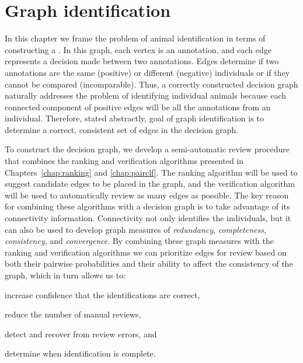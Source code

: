 \chapter{Graph identification}\label{chap:graphid}
\newcommand{\nT}{N}

In this chapter we frame the problem of animal identification in terms of constructing a %
.
In this graph, each vertex is an annotation, and each edge represents a decision made between two annotations.
Edges determine if two annotations are the same (positive) or different (negative) individuals or if they cannot
  be compared (incomparable).
Thus, a correctly constructed decision graph naturally addresses the problem of identifying individual animals
  because each connected component of positive edges will be all the annotations from an individual.
Therefore, stated abstractly, goal of graph identification is to determine a correct, consistent set of edges in
  the decision graph.

To construct the decision graph, we develop a semi-automatic review procedure that combines the ranking and
verification algorithms presented in Chapters~\ref{chap:ranking} and \ref{chap:pairclf}. The ranking algorithm will
be used to suggest candidate edges to be placed in the graph, and the verification algorithm will be used to
automatically review as many edges as possible.  The key reason for combining these algorithms with a decision
graph is to take advantage of its connectivity information.  Connectivity not only identifies the individuals, but
it can also be used to develop graph measures of \emph{redundancy}, \emph{completeness}, \emph{consistency}, and
\emph{convergence}.  By combining these graph measures with the ranking and verification algorithms we can
prioritize edges for review based on both their pairwise probabilities and their ability to affect the consistency
of the graph, which in turn allows us to:
\begin{enumin}
\item increase confidence that the identifications are correct, %
\item reduce the number of manual reviews,  %
\item detect and recover from review errors, and %
\item determine when identification is complete. %
\end{enumin}

